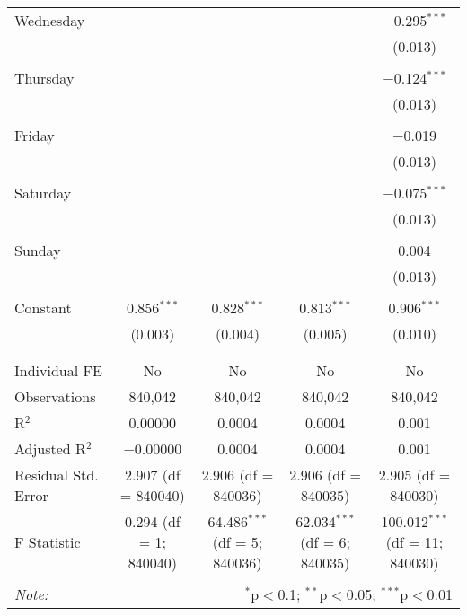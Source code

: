 \documentclass[
]{article}
\begin{document}
\begin{table}[!htbp]
{\begin{tabular}{@{\extracolsep{5pt}}lcccc}
 Wednesday &  &  &  & $-$0.295$^{***}$ \\ 
  &  &  &  & (0.013) \\ 
  & & & & \\ 
 Thursday &  &  &  & $-$0.124$^{***}$ \\ 
  &  &  &  & (0.013) \\ 
  & & & & \\ 
 Friday &  &  &  & $-$0.019 \\ 
  &  &  &  & (0.013) \\ 
  & & & & \\ 
 Saturday &  &  &  & $-$0.075$^{***}$ \\ 
  &  &  &  & (0.013) \\ 
  & & & & \\ 
 Sunday &  &  &  & 0.004 \\ 
  &  &  &  & (0.013) \\ 
  & & & & \\ 
 Constant & 0.856$^{***}$ & 0.828$^{***}$ & 0.813$^{***}$ & 0.906$^{***}$ \\ 
  & (0.003) & (0.004) & (0.005) & (0.010) \\ 
  & & & & \\ 
\hline \\[-1.8ex] 
Individual FE & No & No & No & No \\ 
Observations & 840,042 & 840,042 & 840,042 & 840,042 \\ 
R$^{2}$ & 0.00000 & 0.0004 & 0.0004 & 0.001 \\ 
Adjusted R$^{2}$ & $-$0.00000 & 0.0004 & 0.0004 & 0.001 \\ 
Residual Std. Error & 2.907 (df = 840040) & 2.906 (df = 840036) & 2.906 (df = 840035) & 2.905 (df = 840030) \\ 
F Statistic & 0.294 (df = 1; 840040) & 64.486$^{***}$ (df = 5; 840036) & 62.034$^{***}$ (df = 6; 840035) & 100.012$^{***}$ (df = 11; 840030) \\ 
\hline 
\hline \\[-1.8ex] 
\textit{Note:}  & \multicolumn{4}{r}{$^{*}$p$<$0.1; $^{**}$p$<$0.05; $^{***}$p$<$0.01} \\ 
\end{tabular}
} 
\end{table} 
\newpage
\end{document}
